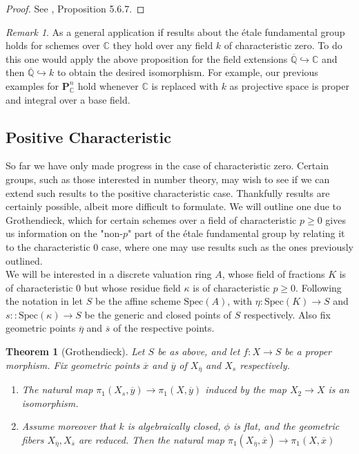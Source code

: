 \documentclass{article}
\newtheorem{theorem}{Theorem}[section]
\theoremstyle{definition}
\theoremstyle{remark}
\newtheorem*{remark}{Remark}
\newcommand{\C}{\mathbb{C}}
\newcommand{\Q}{\mathbb{Q}}
\begin{document}
\begin{proof}
	See \cite{Szamuely}, Proposition 5.6.7.
\end{proof}

\begin{remark}
	As a general application if results about the \'etale fundamental group holds for schemes over $\C$ they hold over any field  $k$ of characteristic zero.
	To do this one would apply the above proposition for the field extensions $\overline{\Q} \hookrightarrow \C$ and then $\overline{\Q} \hookrightarrow k$ to obtain the desired isomorphism.
	For example, our previous examples for $\textbf{P}_{\C}^n$ hold whenever $\C$ is replaced with $k$ as projective space is proper and integral over a base field.
\end{remark}

\subsection{Positive Characteristic}

So far we have only made progress in the case of characteristic zero.
Certain groups, such as those interested in number theory, may wish to see if we can extend such results
to the positive characteristic case.
Thankfully results are certainly possible, albeit more difficult to formulate.
We will outline one due to Grothendieck, which for certain schemes over a field of characteristic $p \geq 0$ gives us information on the "non-$p$" part of the \'etale fundamental group by relating it to the characteristic 0 case, where one may use results such as the ones previously outlined.\\

\indent We will be interested in a discrete valuation ring $A$, whose field of fractions $K$ is of characteristic 0 but whose residue field $\kappa$ is of characteristic $p \geq 0$.
Following the notation in \cite{Szamuely} let $S$ be the affine scheme $\text{Spec}(A)$, with $\eta \colon \text{Spec}(K) \to S$ and $s \colon: \text{Spec}(\kappa) \to S$ be the generic and closed points of $S$ respectively.
Also fix geometric points $\overline{\eta}$ and $\overline{s}$ of the respective points.

\begin{theorem}[Grothendieck]
	Let $S$ be as above, and let $f: X \to S$ be a proper morphism.
	Fix geometric points $\overline{x}$ and $\overline{y}$ of $X_{\overline{\eta}}$ and $X_s$ respectively.
	\begin{enumerate}
		\item The natural map $\pi_1(X_s, \overline{y}) \to \pi_1(X, \overline{y})$ induced by the map $X_2 \to X$ is an isomorphism.
		\item Assume moreover that $k$ is algebraically closed, $\phi$ is flat, and the geometric fibers $X_{\overline{\eta}}, X_{\overline{s}}$  are reduced.
			Then the natural map $\pi_1(X_{\overline{\eta}}, \overline{x}) \to \pi_1(X, \overline{x})$
	\end{enumerate}
	
\end{theorem}
\end{document}
